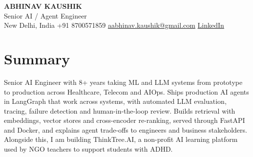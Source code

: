 \documentclass[10pt,a4paper]{article}
\begin{document}
\begin{center}
  {\LARGE\bfseries ABHINAV KAUSHIK}\\[2pt]
  {\large Senior AI / Agent Engineer}\\[2pt]
  New Delhi, India \textbar{} +91 8700571859 \textbar{} \href{mailto:aabhinav.kaushik@gmail.com}{aabhinav.kaushik@gmail.com} \textbar{} \href{https://www.linkedin.com/in/abhinav-kaushik10/}{LinkedIn}  
\end{center}

\section{Summary}
Senior AI Engineer with 8+ years taking ML and LLM systems from prototype to production across Healthcare, Telecom and AIOps. Ships production AI agents in LangGraph that work across systems, with automated LLM evaluation, tracing, failure detection and human-in-the-loop review. Builds retrieval with embeddings, vector stores and cross-encoder re-ranking, served through FastAPI and Docker, and explains agent trade-offs to engineers and business stakeholders. Alongside this, I am building ThinkTree.AI, a non-profit AI learning platform used by NGO teachers to support students with ADHD.
\end{document}
